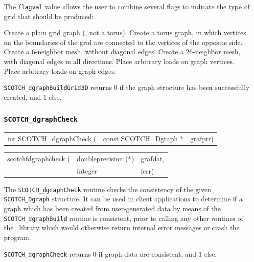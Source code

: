 \begin{itemize}
The \texttt{flagval} value allows the user to combine several flags to
indicate the type of grid that should be produced:
\begin{itemize}
Create a plain grid graph (\ie, not a torus).
Create a torus graph, in which vertices on the boundaries of the grid
are connected to the vertices of the opposite side.
Create a $6$-neighbor mesh, without diagonal edges.
Create a $26$-neighbor mesh, with diagonal edges in all directions.
Place arbitrary loads on graph vertices.
Place arbitrary loads on graph edges.
\end{itemize}

\progret

{\tt SCOTCH\_dgraphBuildGrid3D} returns $0$ if the graph structure has
been successfully created, and $1$ else.
\end{itemize}

\subsubsection{{\tt SCOTCH\_dgraphCheck}}

\begin{itemize}
\progsyn

{\tt\begin{tabular}{l@{}ll}
int SCOTCH\_dgraphCheck ( & const SCOTCH\_Dgraph * & grafptr)
\end{tabular}}

{\tt\begin{tabular}{l@{}ll}
scotchfdgraphcheck ( & doubleprecision (*) & grafdat, \\
                     & integer             & ierr)
\end{tabular}}

\progdes

The {\tt SCOTCH\_dgraphCheck} routine checks the consistency of the
given {\tt SCOTCH\_\lbt Dgraph} structure. It can be used in client
applications to determine if a graph which has been created from
user-generated data by means of the {\tt SCOTCH\_\lbt dgraph\lbt Build}
routine is consistent, prior to calling any other routines of the
\libscotch\ library which would otherwise return internal error
messages or crash the program.

\progret

{\tt SCOTCH\_dgraphCheck} returns $0$ if graph data are consistent, and
$1$ else.

\end{itemize}

